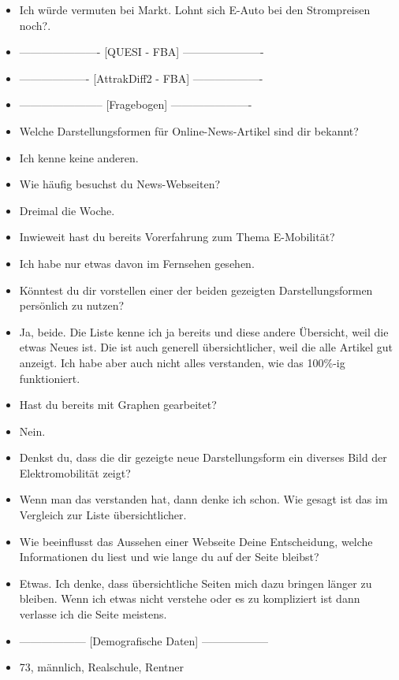 {\begin{itemize}[]
            \item {} Ich würde vermuten bei Markt. \flqq Lohnt sich E-Auto bei den Strompreisen noch?\frqq{}.
            \item {----------------------} [QUESI - FBA] {----------------------}
            \item {-------------------} [AttrakDiff2 - FBA] {-------------------}
            \item {-----------------------} [Fragebogen] {----------------------}
            \item {} Welche Darstellungsformen für Online-News-Artikel sind dir bekannt?
            \item {} Ich kenne keine anderen.
            \item {} Wie häufig besuchst du News-Webseiten?
            \item {} Dreimal die Woche.
            \item {} Inwieweit hast du bereits Vorerfahrung zum Thema E-Mobilität?
            \item {} Ich habe nur etwas davon im Fernsehen gesehen.
            \item {} Könntest du dir vorstellen einer der beiden gezeigten Darstellungsformen persönlich zu nutzen?
            \item {} Ja, beide. Die Liste kenne ich ja bereits und diese andere Übersicht, weil die etwas Neues ist.
                  Die ist auch generell übersichtlicher, weil die alle Artikel gut anzeigt.
                  Ich habe aber auch nicht alles verstanden, wie das 100\%-ig funktioniert.
            \item {} Hast du bereits mit Graphen gearbeitet?
            \item {} Nein.
            \item {} Denkst du, dass die dir gezeigte neue Darstellungsform ein diverses Bild der Elektromobilität zeigt?
            \item {} Wenn man das verstanden hat, dann denke ich schon.
                  Wie gesagt ist das im Vergleich zur Liste übersichtlicher.
            \item {} Wie beeinflusst das Aussehen einer Webseite Deine Entscheidung, welche Informationen du liest und wie lange du auf der Seite bleibst?
            \item {} Etwas. Ich denke, dass übersichtliche Seiten mich dazu bringen länger zu bleiben.
                  Wenn ich etwas nicht verstehe oder es zu kompliziert ist dann verlasse ich die Seite meistens.
            \item {------------------} [Demografische Daten] {------------------}
            \item {} 73, männlich, Realschule, Rentner
      \end{itemize}}
\nolinenumbers
